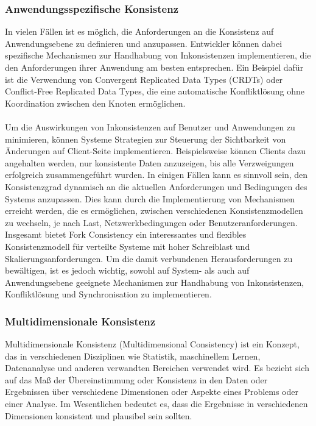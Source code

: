 \documentclass[../vs-script-first-v01.tex]{subfiles}
\begin{document}
\subsubsection{Anwendungsspezifische Konsistenz}
In vielen Fällen ist es möglich, die Anforderungen an die Konsistenz auf Anwendungsebene zu definieren und anzupassen. Entwickler können dabei spezifische Mechanismen zur Handhabung von Inkonsistenzen implementieren, die den Anforderungen ihrer Anwendung am besten entsprechen. Ein Beispiel dafür ist die Verwendung von Convergent Replicated Data Types (CRDTs) oder Conflict-Free Replicated Data Types, die eine automatische Konfliktlösung ohne Koordination zwischen den Knoten ermöglichen.
\\\\
Um die Auswirkungen von Inkonsistenzen auf Benutzer und Anwendungen zu minimieren, können Systeme Strategien zur Steuerung der Sichtbarkeit von Änderungen auf Client-Seite implementieren. Beispielsweise können Clients dazu angehalten werden, nur konsistente Daten anzuzeigen, bis alle Verzweigungen erfolgreich zusammengeführt wurden. In einigen Fällen kann es sinnvoll sein, den Konsistenzgrad dynamisch an die aktuellen Anforderungen und Bedingungen des Systems anzupassen. Dies kann durch die Implementierung von Mechanismen erreicht werden, die es ermöglichen, zwischen verschiedenen Konsistenzmodellen zu wechseln, je nach Last, Netzwerkbedingungen oder Benutzeranforderungen.
Insgesamt bietet Fork Consistency ein interessantes und flexibles Konsistenzmodell für verteilte Systeme mit hoher Schreiblast und Skalierungsanforderungen. Um die damit verbundenen Herausforderungen zu bewältigen, ist es jedoch wichtig, sowohl auf System- als auch auf Anwendungsebene geeignete Mechanismen zur Handhabung von Inkonsistenzen, Konfliktlösung und Synchronisation zu implementieren.


\subsubsection{Multidimensionale Konsistenz }

Multidimensionale Konsistenz (Multidimensional Consistency) ist ein Konzept, das in verschiedenen Disziplinen wie Statistik, maschinellem Lernen, Datenanalyse und anderen verwandten Bereichen verwendet wird. Es bezieht sich auf das Maß der Übereinstimmung oder Konsistenz in den Daten oder Ergebnissen über verschiedene Dimensionen oder Aspekte eines Problems oder einer Analyse. Im Wesentlichen bedeutet es, dass die Ergebnisse in verschiedenen Dimensionen konsistent und plausibel sein sollten.
\end{document}

